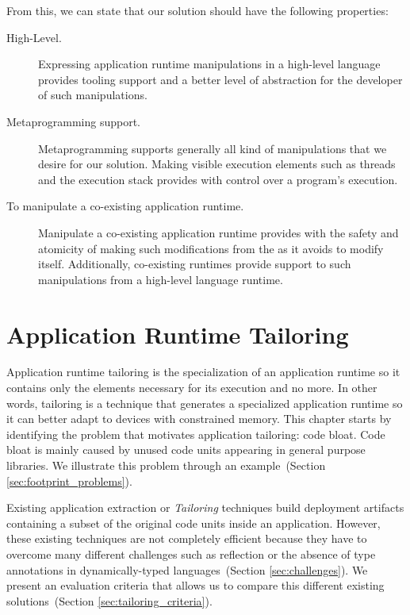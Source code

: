 From this, we can state that our solution should have the following properties:

\begin{description}

\item[High-Level.] Expressing application runtime manipulations in a high-level language provides tooling support and a better level of abstraction for the developer of such manipulations. 

\item[Metaprogramming support.] Metaprogramming supports generally all kind of manipulations that we desire for our solution. Making visible execution elements such as threads and the execution stack provides with control over a program's execution.

\item[To manipulate a co-existing application runtime.] Manipulate a co-existing application runtime provides with the safety and atomicity of making such modifications from the \VM as it avoids to modify itself. Additionally, co-existing runtimes provide support to such manipulations from a high-level language runtime.

\end{description}


\chapter{Application Runtime Tailoring}
\minitoc

Application runtime tailoring is the specialization of an application runtime so it contains only the elements necessary for its execution and no more. In other words, tailoring is a technique that generates a specialized application runtime so it can better adapt to devices with constrained memory.
This chapter starts by identifying the problem that motivates application tailoring: code bloat. Code bloat is mainly caused by unused code units appearing in general purpose libraries.
We illustrate this problem through an example~(Section \ref{sec:footprint_problems}).

Existing application extraction or \emph{Tailoring} techniques build deployment artifacts containing a subset of the original code units inside an application. However, these existing techniques are not completely efficient because they have to overcome many different challenges such as reflection or the absence of type annotations in dynamically-typed languages~(Section \ref{sec:challenges}). We present an evaluation criteria that allows us to compare this different existing solutions~(Section \ref{sec:tailoring_criteria}).


